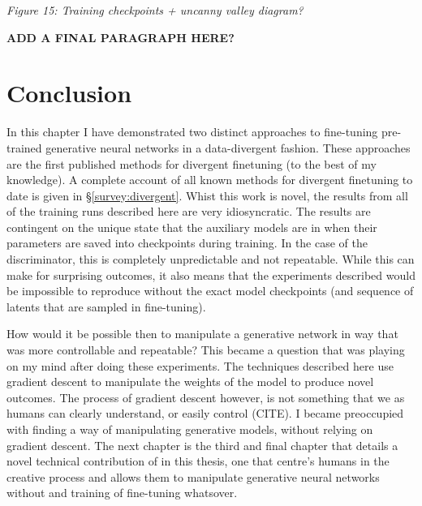 \textit{Figure 15: Training checkpoints + uncanny valley diagram?}

\textbf{ADD A FINAL PARAGRAPH HERE?}


\section{Conclusion}

In this chapter I have demonstrated two distinct approaches to fine-tuning pre-trained generative neural networks in a data-divergent fashion.
These approaches are the first published methods for divergent finetuning (to the best of my knowledge).
A complete account of all known methods for divergent finetuning to date is given in \S \ref{survey:divergent}.
Whist this work is novel, the results from all of the training runs described here are very idiosyncratic. 
The results are contingent on the unique state that the auxiliary models are in when their parameters are saved into checkpoints during training. 
In the case of the discriminator, this is completely unpredictable and not repeatable. 
While this can make for surprising outcomes, it also means that the experiments described would be impossible to reproduce without the exact model checkpoints (and sequence of latents that are sampled in fine-tuning).

How would it be possible then to manipulate a generative network in way that was more controllable and repeatable?
This became a question that was playing on my mind after doing these experiments. 
The techniques described here use gradient descent to manipulate the weights of the model to produce novel outcomes. 
The process of gradient descent however, is not something that we as humans can clearly understand, or easily control (CITE).
I became preoccupied with finding a way of manipulating generative models, without relying on gradient descent. 
The next chapter is the third and final chapter that details a novel technical contribution of in this thesis, one that centre's humans in the creative process and allows them to manipulate generative neural networks without and training of fine-tuning whatsover.
